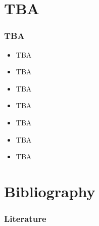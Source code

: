 \documentclass{beamer}
\begin{document}
\section{TBA}
\begin{frame} \frametitle{TBA} 
\begin{itemize}
      \item{TBA}
      \item{TBA}
      \item{TBA}
      \item{TBA}
      \item{TBA}
      \item{TBA}
      \item{TBA}
\end{itemize}
\end{frame}
      
\section{Bibliography}
\begin{frame}[allowframebreaks] \frametitle{Literature} 


\end{frame}
\end{document}
